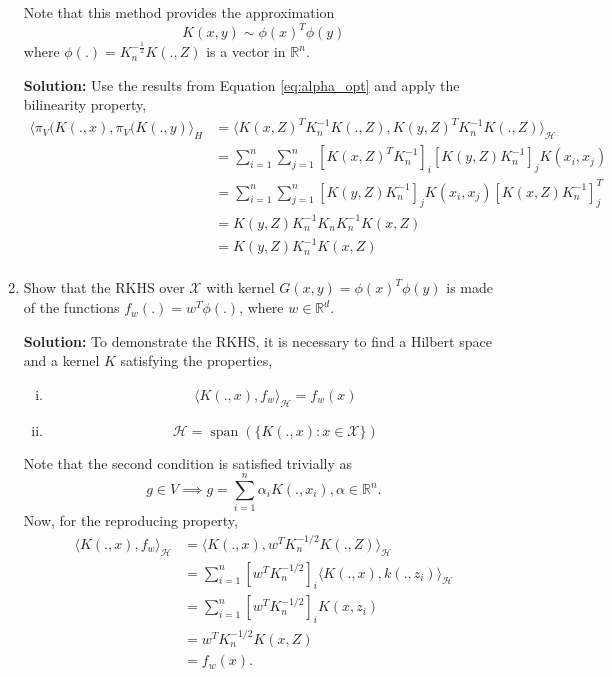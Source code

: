 \documentclass{article}[12pt]
\begin{document}
\begin{enumerate}
 Note that this method provides the approximation 
 \begin{equation}
K(x,y) \sim \phi(x)^T \phi(y) 
\end{equation}  
 where $\phi(.)=K_n^{-\frac{1}{2}}K(.,Z)$ is a vector in $\mathbb{R}^n$.

 \textbf{Solution:} Use the results from Equation \ref{eq:alpha_opt} and apply the bilinearity property,
 \begin{equation}
	 \begin{aligned}
		 \langle \pi_V(K(.,x),\pi_V(K(.,y) \rangle_H &= \langle K(x, Z)^T K_n^{-1} K(., Z), K(y, Z)^T K_n^{-1} K(., Z) \rangle_{\mathcal H}\\
							     &= \sum^{n}_{i=1} \sum^{n}_{j=1} \left[ K(x, Z)^T K_n^{-1} \right]_i \left[ K(y, Z) K_n^{-1} \right]_j K(x_i, x_j) \\
							     &= \sum^{n}_{i=1} \sum^{n}_{j=1} \left[ K(y, Z) K_n^{-1} \right]_j K(x_i, x_j) \left[ K(x, Z) K_n^{-1} \right]^T_j \\
							     &= K(y, Z) K_n^{-1} K_n K_n^{-1} K(x, Z) \\
							     &= K(y, Z) K_n^{-1} K(x, Z) \\
	 \end{aligned}
 \end{equation}
 

\item Show that the RKHS over $\mathcal{X}$ with kernel $G(x,y)=\phi(x)^T\phi(y)$ is made of the functions $f_w(.)=w^T\phi(.)$, where $w \in \mathbb{R}^d$.

	\textbf{Solution:} To demonstrate the RKHS, it is necessary to find a Hilbert space and a kernel $K$ satisfying the properties,
	\begin{enumerate}[(i)]
		\item \[
				\langle K(., x), f_w \rangle_{\mathcal H} = f_w(x)
		\]
		\item \[
				\mathcal H = \operatorname{span}(\{K(., x): x \in \mathcal X\}) 
		\] 
	\end{enumerate}
Note that the second condition is satisfied trivially as
\begin{equation}
	g \in V \implies g = \sum^{n}_{i=1} \alpha_i K(., x_i), \alpha \in \mathbb R^n. 
\end{equation}
Now, for the reproducing property,
\begin{equation}
	\begin{aligned}
		\langle K(., x), f_w \rangle_{\mathcal H} &= \langle K(., x), w^T K_n^{-1/2} K(., Z) \rangle_{\mathcal H}\\
							  &= \sum^{n}_{i=1} \left[ w^T K_n^{-1/2} \right]_i \langle K(., x), k(., z_i) \rangle_{\mathcal H} \\
									     &= \sum^{n}_{i=1} \left[w^T K_n^{-1/2} \right]_i K(x, z_i)\\
									     &= w^T K_n^{-1/2} K(x, Z) \\
									     &= f_w(x).
	\end{aligned}
\end{equation}



 \end{enumerate}
\end{document}
